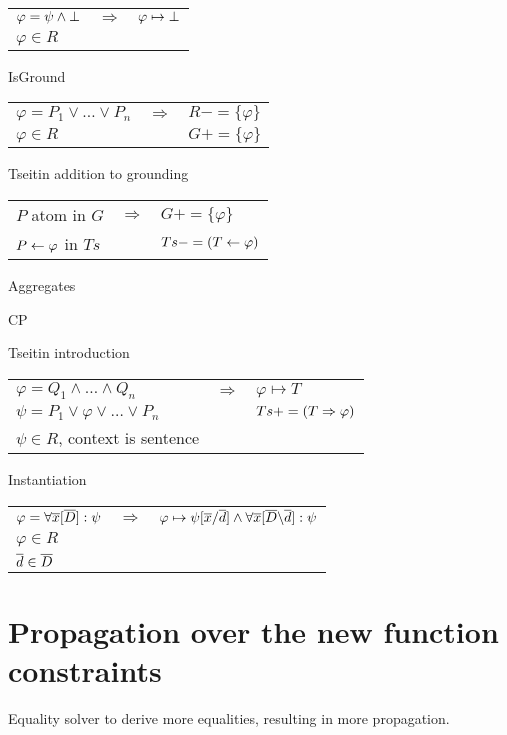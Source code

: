 \documentclass{article}
\newcommand{\DDD}{\ensuremath{\overline{D}}}
\begin{document}
\begin{tabular}{|lcl|} \hline
$\varphi=\psi \land \bot$ & $\Longrightarrow$ & $\varphi \mapsto \bot$ \\
$\varphi \in R$ &&\\
\hline
\end{tabular}

\noindent IsGround

\begin{tabular}{|lcl|} \hline
$\varphi = P_1 \lor \ldots \lor P_n$ & $\Longrightarrow$ & $R-=\{\varphi\}$ \\
$\varphi \in R$ && $G+=\{\varphi\}$\\
\hline
\end{tabular}

\noindent Tseitin addition to grounding

\begin{tabular}{|lcl|} \hline
$P$ atom in $G$ & $\Longrightarrow$ & $G+=\{\varphi\}$ \\
$P \leftarrow \varphi$ in $Ts$ && $Ts -= (T \leftarrow \varphi)$\\
\hline
\end{tabular}

\noindent Aggregates

\noindent CP

\noindent Tseitin introduction

\begin{tabular}{|lcl|} \hline
$\varphi = Q_1 \land \ldots \land Q_n$ & $\Longrightarrow$& $\varphi\mapsto T$\\
$\psi = P_1 \lor \varphi \lor \ldots \lor P_n $ && $Ts += (T \Rightarrow \varphi)$\\
$\psi \in R$, context is sentence &&\\
\hline
\end{tabular}

\noindent Instantiation

\begin{tabular}{|lcl|} \hline
$\varphi = \forall \xxx[\DDD]: \psi$ & $\Longrightarrow$ & $\varphi \mapsto \psi[\xxx\subs\ddd] \land \forall \xxx[\DDD\elim\ddd]: \psi$\\
$\varphi \in R$ && \\
$\ddd \in \DDD$ && \\
\hline
\end{tabular}

\section{Propagation over the new function constraints}
Equality solver to derive more equalities, resulting in more propagation.
\end{document}
